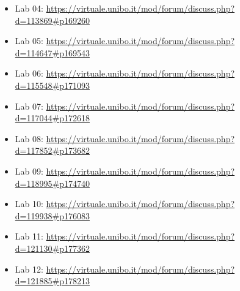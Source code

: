 \documentclass[a4paper,12pt]{report}
\begin{document}
\begin{itemize}
	\item Lab 04: \url{https://virtuale.unibo.it/mod/forum/discuss.php?d=113869#p169260}
	\item Lab 05: \url{https://virtuale.unibo.it/mod/forum/discuss.php?d=114647#p169543}
	\item Lab 06: \url{https://virtuale.unibo.it/mod/forum/discuss.php?d=115548#p171093}
	\item Lab 07: \url{https://virtuale.unibo.it/mod/forum/discuss.php?d=117044#p172618}
	\item Lab 08: \url{https://virtuale.unibo.it/mod/forum/discuss.php?d=117852#p173682}
	\item Lab 09: \url{https://virtuale.unibo.it/mod/forum/discuss.php?d=118995#p174740}
	\item Lab 10: \url{https://virtuale.unibo.it/mod/forum/discuss.php?d=119938#p176083}
	\item Lab 11: \url{https://virtuale.unibo.it/mod/forum/discuss.php?d=121130#p177362}
	\item Lab 12: \url{https://virtuale.unibo.it/mod/forum/discuss.php?d=121885#p178213}


\end{itemize}
\end{document}
